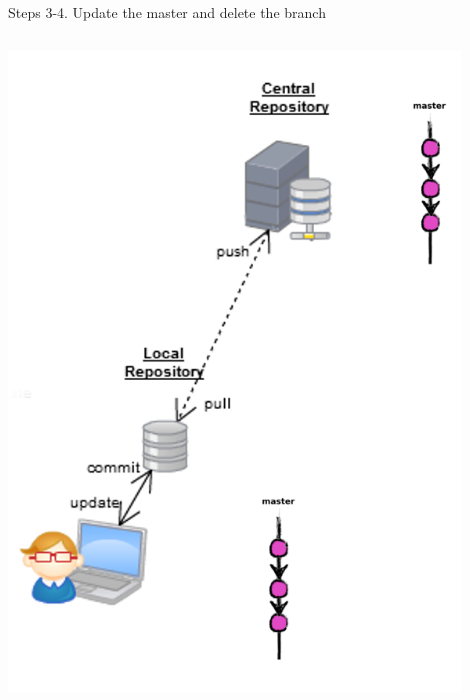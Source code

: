 \begin{frame}[fragile]{Steps 3-4. Update the master and delete the branch}
\begin{columns}
\begin{column}{0.4\textwidth}
\begin{center}
{			}\only<4> {
				\includegraphics[width=0.9\textwidth]{branch_pushed.png}
			}
		\end{center}
	\end{column}
\end{columns}
\end{frame}


